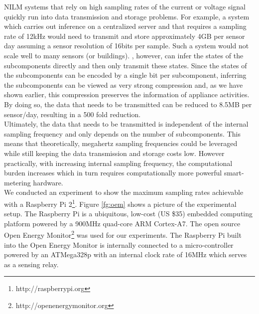NILM systems that rely on high sampling rates of the current or voltage signal quickly run into data transmission and storage problems. For example, a system which carries out inference on a centralized server and that requires a sampling rate of 12kHz would need to transmit and store approximately 4GB per sensor day assuming a sensor resolution of 16bits per sample. Such a system would not scale well to many sensors (or buildings). \ourname, however, can infer the states of the subcomponents directly and then only transmit these states. Since the states of the subcomponents can be encoded by a single bit per subcomponent, inferring the subcomponents can be viewed as very strong compression and, as we have shown earlier, this compression preserves the information of appliance activities. By doing so, the data that needs to be transmitted can be reduced to 8.5MB per sensor/day, resulting in a 500 fold reduction.\\
Ultimately, the data that needs to be transmitted is independent of the internal sampling frequency and only depends on the number of subcomponents. This means that theoretically, megahertz sampling frequencies could be leveraged while still keeping the data transmission and storage costs low. However practically, with increasing internal sampling frequency, the computational burden increases which in turn requires computationally more powerful smart-metering hardware.\\
We conducted an experiment to show the maximum sampling rates achievable with a Raspberry Pi 2\footnote{http://raspberrypi.org}. Figure \ref{fg:oem} shows a picture of the experimental setup. The Raspberry Pi is a ubiquitous, low-cost (US \$35) embedded computing platform powered by a 900MHz quad-core ARM Cortex-A7. The open source Open Energy Monitor\footnote{http://openenergymonitor.org} was used for our experiments. The Raspberry Pi built into the Open Energy Monitor is internally connected to a micro-controller powered by an ATMega328p with an internal clock rate of 16MHz which serves as a sensing relay.

